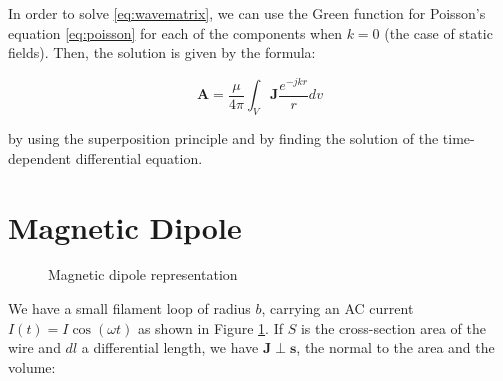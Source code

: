 In order to solve \ref{eq:wavematrix}, we can use the 
Green function for Poisson's equation \ref{eq:poisson} 
for each of the components when $k = 0$ (the case of 
static fields). Then, the solution is given by the 
formula:

\begin{equation}
    \mathbf{A} = \frac{\mu}{4 \pi} \int_V 
    \mathbf{J} \frac{e^{-jkr}}{r} dv
    \label{eq:solA}
\end{equation}

by using the superposition principle and by finding the 
solution of the time-dependent differential equation.

\section{Magnetic Dipole}

\begin{figure}
    \centering
    \caption{Magnetic dipole representation}
    \label{fig:dipole}
\end{figure}

We have a small filament loop of radius \( b \), 
carrying an AC current \( I(t) = I \cos(\omega t) \) 
as shown in Figure \ref{fig:dipole}. If \( S \) is the 
cross-section area of the wire and \( dl \) a 
differential length, we have \( \mathbf{J} \perp 
\mathbf{s} \), the normal to the area and the volume:

